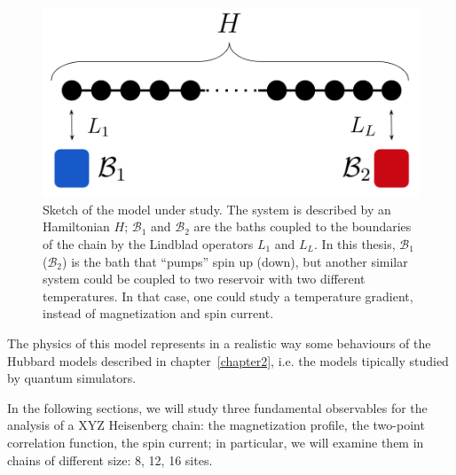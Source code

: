 \begin{figure}[H]
    \centering
    \includegraphics[scale=0.7]{Figures/sketch_model.png}
    \captionsetup{width=1.\linewidth}
    \caption{Sketch of the model under study. The system is described by an Hamiltonian $H$; $\mathcal{B}_1$ and $\mathcal{B}_2$ are the baths coupled to the boundaries of the chain by the Lindblad operators $L_1$ and $L_L$. In this thesis, $\mathcal{B}_1$ ($\mathcal{B}_2$) is the bath that ``pumps'' spin up (down), but another similar system could be coupled to two reservoir with two different temperatures. In that case, one could study a temperature gradient, instead of magnetization and spin current.}
    \label{fig:sketch_model}
\end{figure}


The physics of this model represents in a realistic way some behaviours of the Hubbard models described in chapter~\ref{chapter2}, i.e. the models tipically studied by quantum simulators.

In the following sections, we will study three fundamental observables for the analysis of a XYZ Heisenberg chain: the magnetization profile, the two-point correlation function, the spin current; in particular, we will examine them in chains of different size: 8, 12, 16 sites. 

